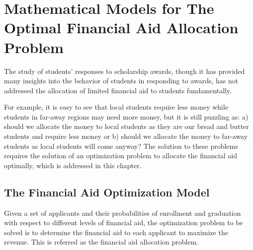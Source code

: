 \documentclass[12pt,english]{report}
\begin{document}

\chapter{Mathematical Models for The Optimal Financial Aid  Allocation Problem }
The study of students' responses to scholarship awards, though it has provided many insights into the behavior of students in responding to awards, has not addressed the allocation of limited financial aid to students fundamentally.

For example, it is easy to see that local students require less money while students in far-away regions may need more money,  but it is still puzzling as: a) should we allocate the money to local students as they are our bread and butter students and require less money or b) should we allocate the money to far-away students as local students will come anyway? The solution to these problems requires the solution of an optimization problem to allocate the financial aid optimally, which is addressed in this chapter.

\section{The Financial Aid Optimization Model}
Given a set of applicants and their probabilities of enrollment and graduation with respect to different levels of financial aid, the optimization problem to be solved is to determine the financial aid to each applicant to  maximize the revenue. This is referred as the financial aid allocation problem.
\end{document}
